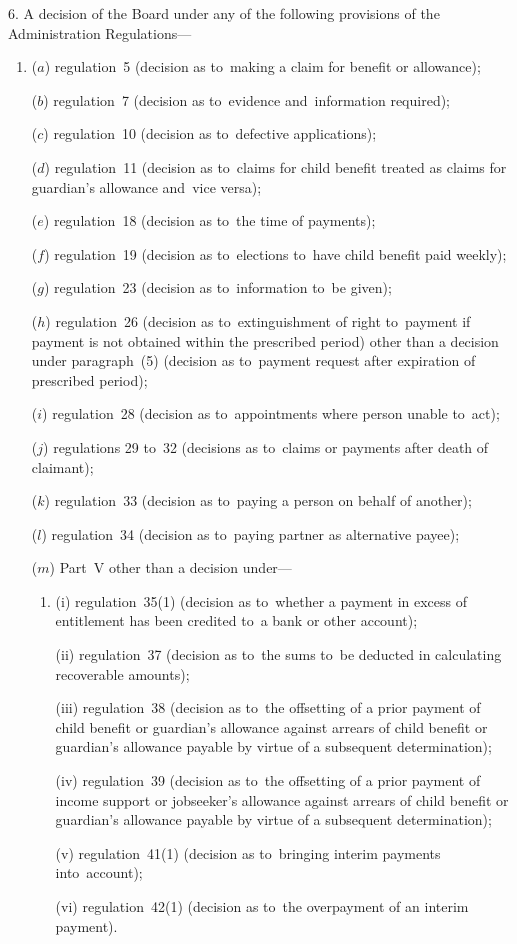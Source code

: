 \documentclass[12pt,a4paper]{article}
\begin{document}
6.  A decision of the Board under any of the following provisions of the Administration Regulations—
\begin{enumerate}\item[]
($a$) regulation~5 (decision as to~making a claim for benefit or allowance);

($b$) regulation~7 (decision as to~evidence and~information required);

($c$) regulation~10 (decision as to~defective applications);

($d$) regulation~11 (decision as to~claims for child benefit treated as claims for guardian’s allowance and~vice versa);

($e$) regulation~18 (decision as to~the time of payments);

($f$) regulation~19 (decision as to~elections to~have child benefit paid weekly);

($g$) regulation~23 (decision as to~information to~be given);

($h$) regulation~26 (decision as to~extinguishment of right to~payment if payment is not obtained within the prescribed period) other than a decision under paragraph~(5) (decision as to~payment request after expiration of prescribed period);

($i$) regulation~28 (decision as to~appointments where person unable to~act);

($j$) regulations 29 to~32 (decisions as to~claims or payments after death of claimant);

($k$) regulation~33 (decision as to~paying a person on behalf of another);

($l$) regulation~34 (decision as to~paying partner as alternative payee);

($m$) Part~V other than a decision under—
\begin{enumerate}\item[]
(i) regulation~35(1) (decision as to~whether a payment in excess of entitlement has been credited to~a bank or other account);

(ii) regulation~37 (decision as to~the sums to~be deducted in calculating recoverable amounts);

(iii) regulation~38 (decision as to~the offsetting of a prior payment of child benefit or guardian’s allowance against arrears of child benefit or guardian’s allowance payable by virtue of a subsequent determination);

(iv) regulation~39 (decision as to~the offsetting of a prior payment of income support or jobseeker’s allowance against arrears of child benefit or guardian’s allowance payable by virtue of a subsequent determination);

(v) regulation~41(1) (decision as to~bringing interim payments into~account);

(vi) regulation~42(1) (decision as to~the overpayment of an interim payment).
\end{enumerate}
\end{enumerate}
\end{document}
